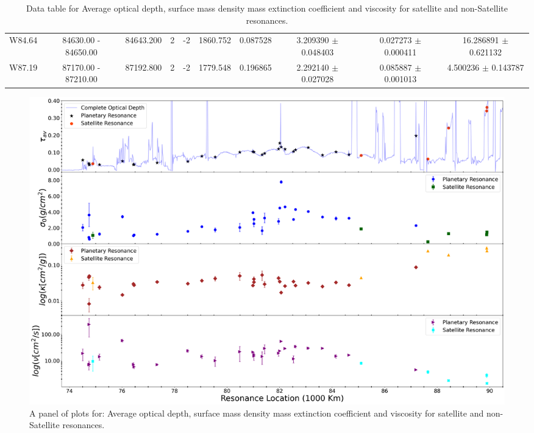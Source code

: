 \documentclass{article}
\begin{document}
\begin{table}[h]
{\begin{tabular}{|c|c|c|c|c|c|c|c|c|c|}
W84.64 & 84630.00 - 84650.00 & 84643.200 & 2 & -2 & 1860.752 & 0.087528 & 3.209390 $\pm$ 0.048403 & 0.027273 $\pm$ 0.000411 & 16.286891 $\pm$ 0.621132 \\
         
W87.19 & 87170.00 - 87210.00 & 87192.800 & 2 & -2 & 1779.548 & 0.196865 & 2.292140 $\pm$ 0.027028 & 0.085887 $\pm$ 0.001013 & 4.500236 $\pm$ 0.143787 \\

\hline
\end{tabular}
\vspace{-1.5cm}
}
\caption{Data table for Average optical depth, surface mass density mass extinction coefficient and viscosity for satellite and non-Satellite resonances.}
\end{table}

\begin{figure}[h]
    \centering
    \includegraphics[width=0.9\linewidth]{tau_sigma_kapp_nu_Updated.png}
    \caption{A panel of plots for: Average optical depth, surface mass density mass extinction coefficient and viscosity for satellite and non-Satellite resonances.}
    \label{fig:enter-label}
\end{figure}

\end{document}
